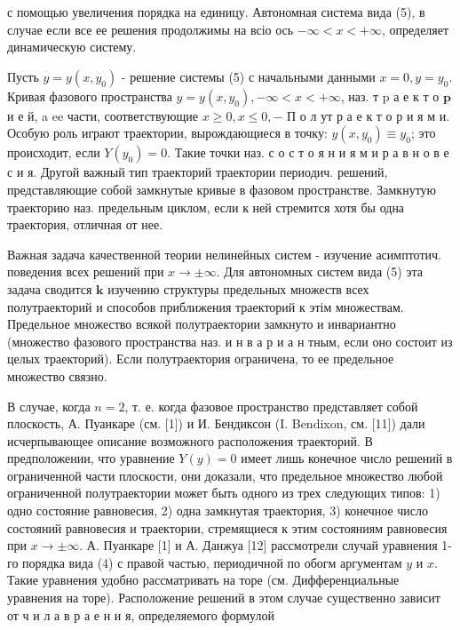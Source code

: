 \documentclass[10pt]{article}
\begin{document}
с помощью увеличения порядка на единицу. Автономная система вида (5), в случае если все ее решения продолжимы на всіо ось $-\infty<x<+\infty$, определяет динамическую систему.



Пусть $y=y\left(x, y_{0}\right)$ - решение системы (5) с начальными данными $x=0, y=y_{0}$. Кривая фазового пространства $y=y\left(x, y_{0}\right),-\infty<x<+\infty$, наз. т $\mathrm{p}$ а е к т о $\mathbf{p}$ и е й, a ee части, соответствующие $x \geqslant 0, x \leqslant 0,-$ П о л ут р а е к т о р и я м и. Особую роль играют траектории, вырождающиеся в точку: $y\left(x, y_{0}\right) \equiv y_{0}$; это происходит, если $Y\left(y_{0}\right)=0$. Такие точки наз. с о с т о я н и я м и р а в н о в е с и я. Другой важный тип траекторий траектории периодич. решений, представляющие собой замкнутые кривые в фазовом пространстве. Замкнутую траекторию наз. предельным циклом, если к ней стремится хотя бы одна траектория, отличная от нее.



Важная задача качественной теории нелинейных систем - изучение асимптотич. поведения всех решений при $x \rightarrow \pm \infty$. Для автономных систем вида (5) эта задача сводится $\mathbf{k}$ изучению структуры предельных множеств всех полутраекторий и способов приближения траекторий к этім множествам. Предельное множество всякой полутраектории замкнуто и инвариантно (множество фазового пространства наз. и н в а р и а н тным, если оно состоит из целых траекторий). Если полутраектория ограничена, то ее предельное множество связно.



В случае, когда $n=2$, т. е. когда фазовое пространство представляет собой плоскость, А. Пуанкаре (см. [1]) и И. Бендиксон (I. Bendixon, см. [11]) дали исчерпывающее описание возможного расположения траекторий. В предположении, что уравнение $Y(y)=0$ имеет лишь конечное число решений в ограниченной части плоскости, они доказали, что предельное множество любой ограниченной полутраектории может быть одного из трех следующих типов: 1) одно состояние равновесия, 2) одна замкнутая траектория, 3) конечное число состояний равновесия и траектории, стремящиеся к этим состояниям равновесия при $x \rightarrow \pm \infty$. А. Пуанкаре [1] и А. Данжуа [12] рассмотрели случай уравнения 1-го порядка вида (4) с правой частью, периодичной по обогм аргументам $y$ и $x$. Такие уравнения удобно рассматривать на торе (см. Дифференциальные уравнения на торе). Расположение решений в этом случае существенно зависит от ч и л а в р а е н и я, определяемого формулой
\end{document}
